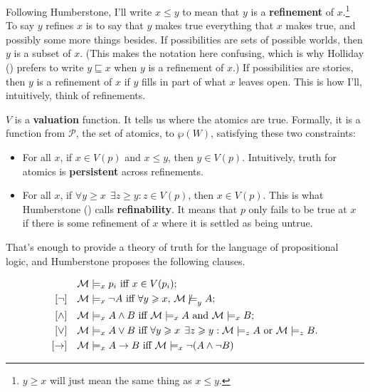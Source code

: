 \documentclass[
  11pt,
  letterpaper,
  DIV=11,
  numbers=noendperiod,
  twoside]{scrartcl}
\providecommand{\tightlist}{%
  \setlength{\itemsep}{0pt}\setlength{\parskip}{0pt}}
\newcommand{\nmodels}{\mathrel{\ooalign{$\models$\cr\raisebox{-0.001ex}{\hss$\mkern-1mu/\hss$}}}}
\begin{document}
Following Humberstone, I'll write \(x \leqslant y\) to mean that \(y\)
is a \textbf{refinement} of \(x\).\footnote{\(y \geqslant x\) will just
  mean the same thing as \(x \leqslant y\).} To say \(y\) refines \(x\)
is to say that \(y\) makes true everything that \(x\) makes true, and
possibly some more things besides. If possibilities are sets of possible
worlds, then \(y\) is a subset of \(x\). (This makes the notation here
confusing, which is why Holliday ()
prefers to write \(y \sqsubseteq x\) when \(y\) is a refinement of
\(x\).) If possibilities are stories, then \(y\) is a refinement of
\(x\) if \(y\) fills in part of what \(x\) leaves open. This is how
I'll, intuitively, think of refinements.

\(V\) is a \textbf{valuation} function. It tells us where the atomics
are true. Formally, it is a function from \(\mathcal{P}\), the set of
atomics, to \(\wp(W)\), satisfying these two constraints:

\begin{itemize}
\tightlist
\item
  For all \(x\), if \(x \in V(p)\) and \(x \leqslant y\), then
  \(y \in V(p)\). Intuitively, truth for atomics is \textbf{persistent}
  across refinements.
\item
  For all \(x\), if
  \(\forall y \geqslant x\;\, \exists z \geqslant y: z \in V(p)\), then
  \(x \in V(p)\). This is what Humberstone
  () calls
  \textbf{refinability}. It means that \(p\) only fails to be true at
  \(x\) if there is some refinement of \(x\) where it is settled as
  being untrue.
\end{itemize}

That's enough to provide a theory of truth for the language of
propositional logic, and Humberstone proposes the following clauses.

\begin{align*}
[\text{Vbls}] \quad & \mathcal{M} \models_x p_i \text{ iff } x \in V(p_i); \\
[\neg] \quad & \mathcal{M} \models_x \neg A \text{ iff } \forall y \geqslant x, \, \mathcal{M} \nmodels_y  A; \\
[\wedge] \quad & \mathcal{M} \models_x A \wedge B \text{ iff } \mathcal{M} \models_x A \text{ and } \mathcal{M} \models_x B; \\
[\vee] \quad & \mathcal{M} \models_x A \vee B \text{ iff } \forall y \geqslant x \;\, \exists z \geqslant y : \mathcal{M} \models_z A \text{ or } \mathcal{M} \models_z B. \\
[\rightarrow] \quad & \mathcal{M} \models_x A \rightarrow B \text{ iff } \mathcal{M} \models_x \neg(A \wedge \neg B)
\end{align*}
\end{document}
